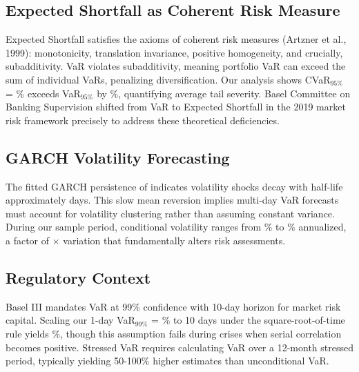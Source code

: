 \documentclass[11pt,a4paper]{article}
\begin{document}
{{\subsection{Expected Shortfall as Coherent Risk Measure}

Expected Shortfall satisfies the axioms of coherent risk measures (Artzner et al., 1999): monotonicity, translation invariance, positive homogeneity, and crucially, subadditivity. VaR violates subadditivity, meaning portfolio VaR can exceed the sum of individual VaRs, penalizing diversification. Our analysis shows CVaR$_{95\%}$ = \% exceeds VaR$_{95\%}$ by \%, quantifying average tail severity. Basel Committee on Banking Supervision shifted from VaR to Expected Shortfall in the 2019 market risk framework precisely to address these theoretical deficiencies.

\subsection{GARCH Volatility Forecasting}

The fitted GARCH persistence of  indicates volatility shocks decay with half-life approximately  days. This slow mean reversion implies multi-day VaR forecasts must account for volatility clustering rather than assuming constant variance. During our sample period, conditional volatility ranges from \% to \% annualized, a factor of $\times$ variation that fundamentally alters risk assessments.

\subsection{Regulatory Context}

Basel III mandates VaR at 99\% confidence with 10-day horizon for market risk capital. Scaling our 1-day VaR$_{99\%}$ = \% to 10 days under the square-root-of-time rule yields \%, though this assumption fails during crises when serial correlation becomes positive. Stressed VaR requires calculating VaR over a 12-month stressed period, typically yielding 50-100\% higher estimates than unconditional VaR.

}}
\end{document}
